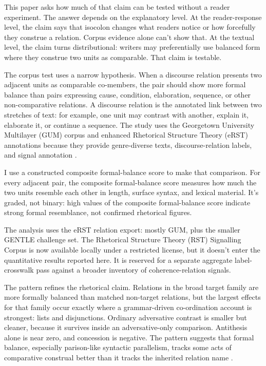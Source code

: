 \documentclass[12pt]{article}
\begin{document}
This paper asks how much of that claim can be tested without a reader
experiment. The answer depends on the explanatory level. At the
reader-response level, the claim says that isocolon changes what readers
notice or how forcefully they construe a relation. Corpus evidence alone
can't show that. At the textual level, the claim turns distributional:
writers may preferentially use balanced form where they construe two
units as comparable. That claim is testable.

The corpus test uses a narrow hypothesis. When a discourse relation presents two
adjacent units as comparable co-members, the pair should show more
formal balance than pairs expressing cause, condition, elaboration,
sequence, or other non-comparative relations. A discourse relation is the
annotated link between two stretches of text: for example, one unit may
contrast with another, explain it, elaborate it, or continue a sequence.
The study uses the
Georgetown University Multilayer (GUM) corpus and enhanced Rhetorical
Structure Theory (eRST) annotations because they provide genre-diverse
texts, discourse-relation labels, and signal annotation
\citep{zeldes2017GUMCorpus,zeldesEtAl2025eRST}.

I use a constructed composite formal-balance score to make that comparison.
For every adjacent pair, the composite formal-balance score measures how
much the two units resemble each other in length, surface syntax, and
lexical material. It's graded, not binary: high values of the composite
formal-balance score indicate strong formal resemblance, not confirmed
rhetorical figures.

The analysis uses the eRST relation export: mostly GUM, plus the smaller
GENTLE challenge set. The Rhetorical Structure Theory (RST) Signalling
Corpus is now available locally under a restricted license, but it doesn't
enter the quantitative results reported here. It is reserved for a separate
aggregate label-crosswalk pass against a broader inventory of
coherence-relation signals.

The pattern refines the rhetorical claim. Relations in the broad target
family are more formally balanced than matched non-target relations, but
the largest effects for that family occur exactly
where a grammar-driven co-ordination account is strongest: lists and
disjunctions. Ordinary adversative contrast is smaller but cleaner,
because it survives inside an adversative-only comparison. Antithesis
alone is near zero, and concession is negative. The pattern suggests that
formal balance, especially parison-like syntactic parallelism, tracks
some acts of comparative construal better than it tracks the inherited
relation name .
\end{document}
